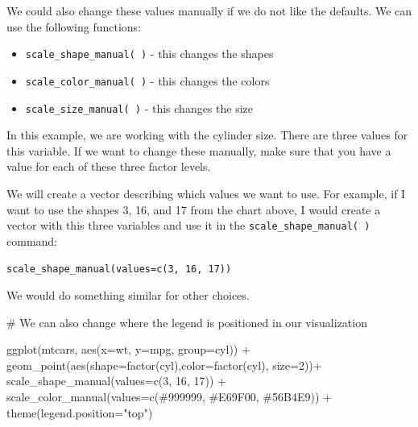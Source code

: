 \documentclass[
  letterpaper,
  DIV=11,
  numbers=noendperiod]{scrreprt}
\newenvironment{Shaded}{\begin{snugshade}}{\end{snugshade}}
\newcommand{\AttributeTok}[1]{\textcolor[rgb]{0.40,0.45,0.13}{#1}}
\newcommand{\CommentTok}[1]{\textcolor[rgb]{0.37,0.37,0.37}{#1}}
\newcommand{\DecValTok}[1]{\textcolor[rgb]{0.68,0.00,0.00}{#1}}
\newcommand{\FunctionTok}[1]{\textcolor[rgb]{0.28,0.35,0.67}{#1}}
\newcommand{\NormalTok}[1]{\textcolor[rgb]{0.00,0.23,0.31}{#1}}
\newcommand{\SpecialCharTok}[1]{\textcolor[rgb]{0.37,0.37,0.37}{#1}}
\newcommand{\StringTok}[1]{\textcolor[rgb]{0.13,0.47,0.30}{#1}}
\providecommand{\tightlist}{%
  \setlength{\itemsep}{0pt}\setlength{\parskip}{0pt}}\usepackage{longtable,booktabs,array}
\begin{document}
We could also change these values manually if we do not like the
defaults. We can use the following functions:

\begin{itemize}
\tightlist
\item
  \texttt{scale\_shape\_manual(\ )} - this changes the shapes
\item
  \texttt{scale\_color\_manual(\ )} - this changes the colors
\item
  \texttt{scale\_size\_manual(\ )} - this changes the size
\end{itemize}

In this example, we are working with the cylinder size. There are three
values for this variable. If we want to change these manually, make sure
that you have a value for each of these three factor levels.

We will create a vector describing which values we want to use. For
example, if I want to use the shapes 3, 16, and 17 from the chart above,
I would create a vector with this three variables and use it in the
\texttt{scale\_shape\_manual(\ )} command:

\texttt{scale\_shape\_manual(values=c(3,\ 16,\ 17))}

We would do something similar for other choices.

\begin{Shaded}
\begin{Highlighting}[]
\CommentTok{\# We can also change where the legend is positioned in our visualization}

\FunctionTok{ggplot}\NormalTok{(mtcars, }\FunctionTok{aes}\NormalTok{(}\AttributeTok{x=}\NormalTok{wt, }\AttributeTok{y=}\NormalTok{mpg, }\AttributeTok{group=}\NormalTok{cyl)) }\SpecialCharTok{+}
  \FunctionTok{geom\_point}\NormalTok{(}\FunctionTok{aes}\NormalTok{(}\AttributeTok{shape=}\FunctionTok{factor}\NormalTok{(cyl),}\AttributeTok{color=}\FunctionTok{factor}\NormalTok{(cyl), }\AttributeTok{size=}\DecValTok{2}\NormalTok{))}\SpecialCharTok{+}
  \FunctionTok{scale\_shape\_manual}\NormalTok{(}\AttributeTok{values=}\FunctionTok{c}\NormalTok{(}\DecValTok{3}\NormalTok{, }\DecValTok{16}\NormalTok{, }\DecValTok{17}\NormalTok{)) }\SpecialCharTok{+}
  \FunctionTok{scale\_color\_manual}\NormalTok{(}\AttributeTok{values=}\FunctionTok{c}\NormalTok{(}\StringTok{\textquotesingle{}\#999999\textquotesingle{}}\NormalTok{, }\StringTok{\textquotesingle{}\#E69F00\textquotesingle{}}\NormalTok{, }\StringTok{\textquotesingle{}\#56B4E9\textquotesingle{}}\NormalTok{)) }\SpecialCharTok{+}
  \FunctionTok{theme}\NormalTok{(}\AttributeTok{legend.position=}\StringTok{"top"}\NormalTok{)}
\end{Highlighting}
\end{Shaded}
\end{document}
